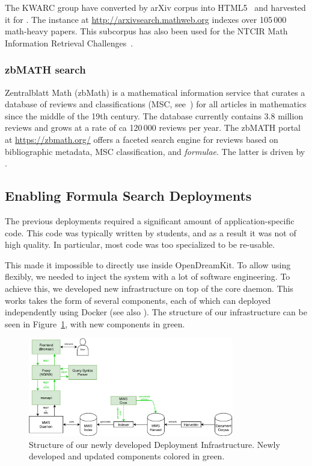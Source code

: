 The KWARC group have converted by arXiv corpus into HTML5~\cite{StaKoh:tlcspx10} and harvested it for \MWS. The instance at \url{http://arxivsearch.mathweb.org}
indexes over 105\,000 math-heavy papers.
This subcorpus has also been used for the NTCIR Math Information Retrieval Challenges~\cite{AizKohOun:nmpto13,AizKohOunSch:nmto14,AizKohOunSch:nmto16}.

\subsubsection{zbMATH search}

Zentralblatt Math (zbMath) is a mathematical information service that curates a database of reviews and classifications (MSC, see~\cite{MSC2010}) for all articles in mathematics since the middle of the 19th century. The database currently contains 3.8 million reviews and grows at a rate of ca 120\,000 reviews per year.
The zbMATH portal at \url{https://zbmath.org/} offers a faceted search engine for reviews based on bibliographic metadata, MSC classification, and \emph{formulae}.
The latter is driven by \MWS. 

\subsection{Enabling Formula Search Deployments}\label{sec:software:deployment}

The previous \MWS deployments required a significant amount of application-specific code. 
This code was typically written by students, and as a result it was not of high quality. 
In particular, most code was too specialized to be re-usable. 

This made it impossible to directly use \MWS inside OpenDreamKit. 
To allow using \MWS flexibly, we needed to inject the system with a lot of software engineering. 
To achieve this, we developed new infrastructure on top of the core \MWS daemon. 
This works takes the form of several components, each of which can deployed independently using Docker  (see also ).
The structure of our infrastructure can be seen in Figure~\ref{fig:mwsdeployment}, with new components in green. 

\begin{figure}[ht]
  \includegraphics[width=0.8\textwidth]{mws_layout.pdf}
  \caption{Structure of our newly developed \MWS Deployment Infrastructure. Newly developed and updated components colored in green. }\label{fig:mwsdeployment}
\end{figure}


